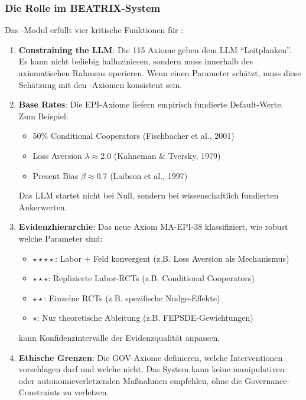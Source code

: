 \subsubsection{Die Rolle im BEATRIX-System}

Das \META-Modul erfüllt vier kritische Funktionen für \BEATRIX:

\begin{enumerate}
    \item \textbf{Constraining the LLM}: Die 115 Axiome geben dem LLM ``Leitplanken''. Es kann nicht beliebig halluzinieren, sondern muss innerhalb des axiomatischen Rahmens operieren. Wenn \BEATRIX{} einen Parameter schätzt, muss diese Schätzung mit den \META-Axiomen konsistent sein.

    \item \textbf{Base Rates}: Die EPI-Axiome liefern empirisch fundierte Default-Werte. Zum Beispiel:
    \begin{itemize}
        \item 50\% Conditional Cooperators (Fischbacher et al., 2001)
        \item Loss Aversion $\lambda \approx 2.0$ (Kahneman \& Tversky, 1979)
        \item Present Bias $\beta \approx 0.7$ (Laibson et al., 1997)
    \end{itemize}
    Das LLM startet nicht bei Null, sondern bei wissenschaftlich fundierten Ankerwerten.

    \item \textbf{Evidenzhierarchie}: Das neue Axiom MA-EPI-38 klassifiziert, wie robust welche Parameter sind:
    \begin{itemize}
        \item $\star\star\star\star$: Labor + Feld konvergent (z.B. Loss Aversion als Mechanismus)
        \item $\star\star\star$: Replizierte Labor-RCTs (z.B. Conditional Cooperators)
        \item $\star\star$: Einzelne RCTs (z.B. spezifische Nudge-Effekte)
        \item $\star$: Nur theoretische Ableitung (z.B. FEPSDE-Gewichtungen)
    \end{itemize}
    \BEATRIX{} kann Konfidenzintervalle der Evidenzqualität anpassen.

    \item \textbf{Ethische Grenzen}: Die GOV-Axiome definieren, welche Interventionen \BEATRIX{} vorschlagen darf und welche nicht. Das System kann keine manipulativen oder autonomieverletzenden Maßnahmen empfehlen, ohne die Governance-Constraints zu verletzen.
\end{enumerate}

